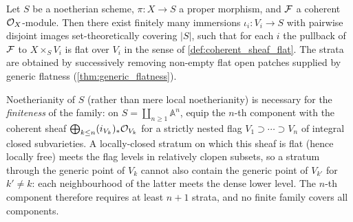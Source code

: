 \begin{lemma}\leanok
  \label{lem:flat_locus_reduction_lean}
  Let \(S\) be a noetherian scheme, \(\pi : X \to S\) a proper morphism,
  and \(\mathcal{F}\) a coherent \(\mathcal{O}_X\)-module. Then there exist finitely many
  immersions \(\iota_i : V_i \to S\) with pairwise disjoint images
  set-theoretically covering \(|S|\), such that for each \(i\) the pullback of
  \(\mathcal{F}\) to \(X \times_S V_i\) is flat over \(V_i\) in the sense of
  \cref{def:coherent_sheaf_flat}.  The strata are obtained by successively
  removing non-empty flat open patches supplied by generic flatness
  (\cref{thm:generic_flatness}).

  Noetherianity of \(S\) (rather than mere local noetherianity) is necessary
  for the \emph{finiteness} of the family: on
  \(S = \coprod_{n \ge 1} \mathbb{A}^n\), equip the \(n\)-th component with
  the coherent sheaf \(\bigoplus_{k \le n} (i_{V_k})_* \mathcal{O}_{V_k}\) for a
  strictly nested flag \(V_1 \supset \cdots \supset V_n\) of integral closed
  subvarieties.  A locally-closed stratum on which this sheaf is flat (hence
  locally free) meets the flag levels in relatively clopen subsets, so a
  stratum through the generic point of \(V_k\) cannot also contain the
  generic point of \(V_{k'}\) for \(k' \neq k\): each neighbourhood of the
  latter meets the dense lower level.  The \(n\)-th component therefore
  requires at least \(n + 1\) strata, and no finite family covers all
  components.
\end{lemma}

